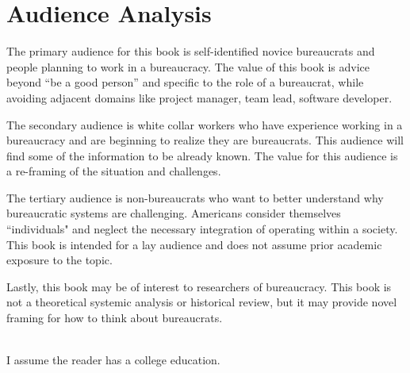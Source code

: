 \section{Audience Analysis}

The primary audience for this book is self-identified novice bureaucrats and people planning to work in a bureaucracy. The value of this book is advice beyond ``be a good person'' and specific to the role of a bureaucrat, while avoiding adjacent domains like project manager, team lead, software developer. 

The secondary audience is white collar workers who have experience working in a bureaucracy and are beginning to realize they are bureaucrats. This audience will find some of the information to be already known.  The value for this audience is a re-framing of the situation and challenges. 

The tertiary audience is non-bureaucrats who want to better understand why bureaucratic systems are challenging. Americans consider themselves ``individuals" and neglect the necessary integration of operating within a society. This book is intended for a lay audience and does not assume prior academic exposure to the topic.

Lastly, this book may be of interest to researchers of bureaucracy. This book is not a theoretical systemic analysis or historical review, but it may provide novel framing for how to think about bureaucrats. 

\ \\

I assume the reader has a college education. 


